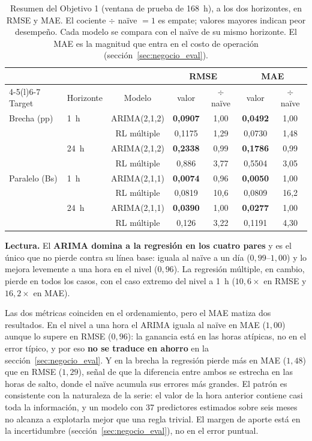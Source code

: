 \begin{table}[H]
\centering\small
\begin{tabular}{@{}llccccc@{}}
\toprule
 & & & \multicolumn{2}{c}{RMSE} & \multicolumn{2}{c}{MAE} \\
\cmidrule(lr){4-5}\cmidrule(l){6-7}
Target & Horizonte & Modelo & valor & $\div$ naïve & valor & $\div$ naïve \\
\midrule
Brecha (pp)   & 1~h  & ARIMA(2{,}1{,}2) & \textbf{0{,}0907} & 1{,}00 & \textbf{0{,}0492} & 1{,}00 \\
              &      & RL múltiple      & 0{,}1175 & 1{,}29 & 0{,}0730 & 1{,}48 \\
              & 24~h & ARIMA(2{,}1{,}2) & \textbf{0{,}2338} & 0{,}99 & \textbf{0{,}1786} & 0{,}99 \\
              &      & RL múltiple      & 0{,}886  & 3{,}77 & 0{,}5504 & 3{,}05 \\
\midrule
Paralelo (Bs) & 1~h  & ARIMA(2{,}1{,}1) & \textbf{0{,}0074} & 0{,}96 & \textbf{0{,}0050} & 1{,}00 \\
              &      & RL múltiple      & 0{,}0819 & 10{,}6 & 0{,}0809 & 16{,}2 \\
              & 24~h & ARIMA(2{,}1{,}1) & \textbf{0{,}0390} & 1{,}00 & \textbf{0{,}0277} & 1{,}00 \\
              &      & RL múltiple      & 0{,}126  & 3{,}22 & 0{,}1191 & 4{,}30 \\
\bottomrule
\end{tabular}
\caption{Resumen del Objetivo 1 (ventana de prueba de 168~h), a los dos
horizontes, en RMSE y MAE. El cociente $\div$ naïve $=1$ es empate; valores
mayores indican peor desempeño. Cada modelo se compara con el naïve de su mismo
horizonte. El MAE es la magnitud que entra en el costo de operación
(sección~\ref{sec:negocio_eval}).}
\label{tab:comparativa}
\end{table}

\textbf{Lectura.} El \textbf{ARIMA domina a la regresión en los cuatro
pares} y es el único que no pierde contra su línea base: iguala al naïve a un
día ($0{,}99$--$1{,}00$) y lo mejora levemente a una hora en el nivel
($0{,}96$). La regresión múltiple, en cambio, pierde en todos los casos, con el
caso extremo del nivel a 1~h ($10{,}6\times$ en RMSE y $16{,}2\times$ en MAE).

Las dos métricas coinciden en el ordenamiento, pero el MAE matiza dos
resultados. En el nivel a una hora el ARIMA iguala al naïve en MAE ($1{,}00$)
aunque lo supere en RMSE ($0{,}96$): la ganancia está en las horas atípicas, no
en el error típico, y por eso \textbf{no se traduce en ahorro} en la
sección~\ref{sec:negocio_eval}. Y en la brecha la regresión pierde más en MAE
($1{,}48$) que en RMSE ($1{,}29$), señal de que la diferencia entre ambos se
estrecha en las horas de salto, donde el naïve acumula sus errores más grandes. El patrón es consistente con la
naturaleza de la serie: el valor de la hora anterior contiene casi toda la
información, y un modelo con 37 predictores estimados sobre seis meses no
alcanza a explotarla mejor que una regla trivial. El margen de aporte está en
la incertidumbre (sección~\ref{sec:negocio_eval}), no en el error puntual.

